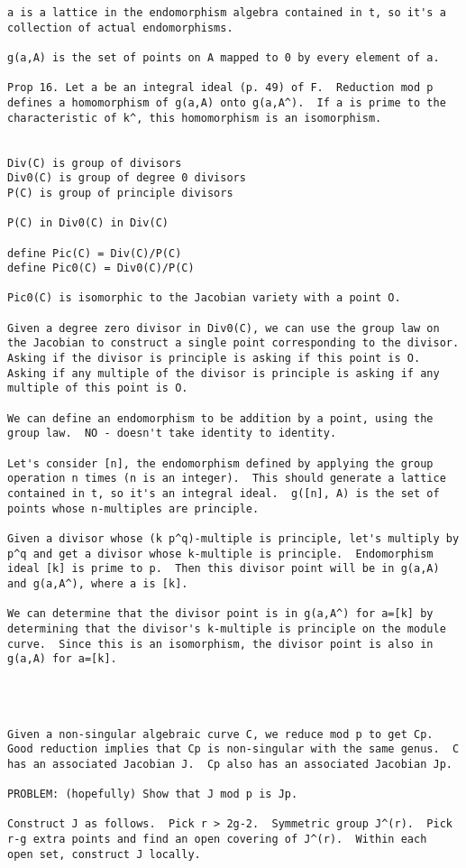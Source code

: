 {\begin{verbatim}
a is a lattice in the endomorphism algebra contained in t, so it's a
collection of actual endomorphisms.

g(a,A) is the set of points on A mapped to 0 by every element of a.

Prop 16. Let a be an integral ideal (p. 49) of F.  Reduction mod p
defines a homomorphism of g(a,A) onto g(a,A^).  If a is prime to the
characteristic of k^, this homomorphism is an isomorphism.


Div(C) is group of divisors
Div0(C) is group of degree 0 divisors
P(C) is group of principle divisors

P(C) in Div0(C) in Div(C)

define Pic(C) = Div(C)/P(C)
define Pic0(C) = Div0(C)/P(C)

Pic0(C) is isomorphic to the Jacobian variety with a point O.

Given a degree zero divisor in Div0(C), we can use the group law on
the Jacobian to construct a single point corresponding to the divisor.
Asking if the divisor is principle is asking if this point is O.
Asking if any multiple of the divisor is principle is asking if any
multiple of this point is O.

We can define an endomorphism to be addition by a point, using the
group law.  NO - doesn't take identity to identity.

Let's consider [n], the endomorphism defined by applying the group
operation n times (n is an integer).  This should generate a lattice
contained in t, so it's an integral ideal.  g([n], A) is the set of
points whose n-multiples are principle.

Given a divisor whose (k p^q)-multiple is principle, let's multiply by
p^q and get a divisor whose k-multiple is principle.  Endomorphism
ideal [k] is prime to p.  Then this divisor point will be in g(a,A)
and g(a,A^), where a is [k].

We can determine that the divisor point is in g(a,A^) for a=[k] by
determining that the divisor's k-multiple is principle on the module
curve.  Since this is an isomorphism, the divisor point is also in
g(a,A) for a=[k].




Given a non-singular algebraic curve C, we reduce mod p to get Cp.
Good reduction implies that Cp is non-singular with the same genus.  C
has an associated Jacobian J.  Cp also has an associated Jacobian Jp.

PROBLEM: (hopefully) Show that J mod p is Jp.

Construct J as follows.  Pick r > 2g-2.  Symmetric group J^(r).  Pick
r-g extra points and find an open covering of J^(r).  Within each
open set, construct J locally.

\end{verbatim}
}

